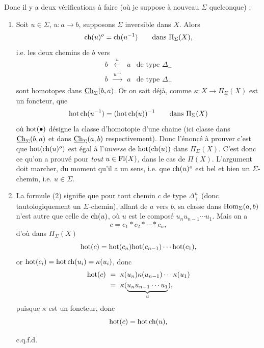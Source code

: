 Donc il y a deux vérifications à faire (où je suppose à nouveau $\Sigma$ quelconque) :

\begin{enumerate}[label={}]
\item[$1^o$)] Soit $u \in \Sigma$, $u : a \longrightarrow b$, supposons $\Sigma$ inversible dans $X$. Alors
\[
\mathrm{ch}(u)^o = \mathrm{ch}(u^{-1}) \qquad \text{dans } \Pi_\Sigma(X),
\]
i.e. les deux chemins de $b$ vers
\[
\begin{array}{cccl}
b & \xleftarrow{\ u\ } & a & \text{de type } \Delta_- \\
b & \xrightarrow{u^{-1}} & a & \text{de type } \Delta_+
\end{array}
\]
sont homotopes dans $\underline{\mathrm{Ch}}_\Sigma(b,a)$. Or on sait déjà, comme $\kappa : X \longrightarrow \Pi_\Sigma(X)$ est un foncteur, que
\[
\mathrm{hot}\,\mathrm{ch}(u^{-1}) = (\mathrm{hot}\,\mathrm{ch}(u))^{-1} \qquad \text{dans } \Pi_\Sigma(X)
\]
où $\mathrm{hot}(\bullet)$ désigne la classe d'homotopie d'une chaine (ici classe dans $\underline{\mathrm{Ch}}_\Sigma(b,a)$ et dans $\underline{\mathrm{Ch}}_\Sigma(a,b)$ respectivement). Donc l'énoncé à prouver c'est que $\mathrm{hot}(\mathrm{ch}(u)^o)$ est égal à l'\textit{inverse} de $\mathrm{hot}(\mathrm{ch}(u))$ dans $\Pi_\Sigma(X)$. C'est donc ce qu'on a prouvé pour \textit{tout} $u \in \mathrm{Fl}(X)$, dans le cas de $\Pi(X)$. L'argument doit marcher, du moment qu'il a un sens, i.e. que $\mathrm{ch}(u)^o$ est bel et bien un $\Sigma$-chemin, i.e. $u \in \Sigma$.

\item[$2^o$)] La formule (2) signifie que pour tout chemin $c$ de type $\Delta_+^n$ (donc tautologiquement un  $\Sigma$-chemin), allant de $a$ vers $b$, sa classe dans $\mathrm{Hom}_\Sigma(a,b)$ n'est autre que celle de $\mathrm{ch}(u)$, où $u$ est le composé $u_nu_{n-1}\cdots u_1$. Mais on a
\[
c = c_1 * c_2 * \cdots * c_n,
\]
d'où dans $\Pi_\Sigma(X)$
\[
\mathrm{hot}(c) = \mathrm{hot}(c_n)\mathrm{hot}(c_{n-1})\cdots\mathrm{hot}(c_1),
\]
or $\mathrm{hot}(c_i) = \mathrm{hot}\,\mathrm{ch}(u_i) = \kappa(u_i)$, donc
\[
\begin{aligned}
\mathrm{hot}(c) \ &= \ \kappa(u_n)\kappa(u_{n-1})\cdots\kappa(u_1) \\
&= \ \kappa(\underbrace{u_nu_{n-1}\cdots u_1}_{u}),
\end{aligned}
\]
puisque $\kappa$ est un foncteur, donc
\[
\mathrm{hot}(c) = \mathrm{hot}\,\mathrm{ch}(u),
\]

\hfill c.q.f.d.
\end{enumerate}

